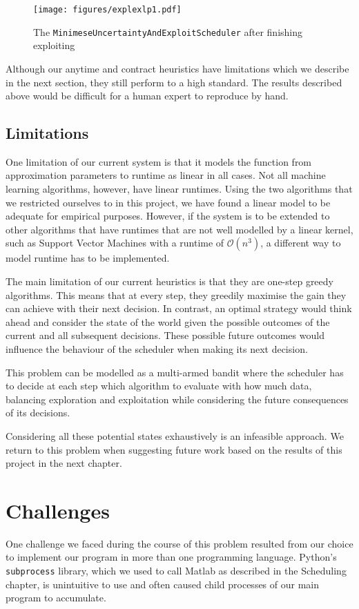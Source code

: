 \documentclass[a4paper,12pt,twoside,openright]{report}
\begin{document}
\begin{figure}
\centering
  \texttt{[image: figures/explexlp1.pdf]}
  \caption{The \texttt{MinimeseUncertaintyAndExploitScheduler} after finishing exploiting}
  \label{explexlp1}
\end{figure}



Although our anytime and contract heuristics have limitations which we describe in the next section, they still perform to a high standard. The results described above would be difficult for a human expert to reproduce by hand.

\subsection{Limitations}
One limitation of our current system is that it models the function from approximation parameters to runtime as linear in all cases. Not all machine learning algorithms, however, have linear runtimes. Using the two algorithms that we restricted ourselves to in this project, we have found a linear model to be adequate for empirical purposes. However, if the system is to be extended to other algorithms that have runtimes that are not well modelled by a linear kernel, such as Support Vector Machines with a runtime of $\mathcal{O}(n^3)$, a different way to model runtime has to be implemented.

The main limitation of our current heuristics is that they are one-step greedy algorithms. This means that at every step, they greedily maximise the gain they can achieve with their next decision. In contrast, an optimal strategy would think ahead and consider the state of the world given the possible outcomes of the current and all subsequent decisions. These possible future outcomes would  influence the behaviour of the scheduler when making its next decision.

This problem can be modelled as a multi-armed bandit where the scheduler has to decide at each step which algorithm to evaluate with how much data, balancing exploration and exploitation while considering the future consequences of its decisions.

Considering all these potential states exhaustively is an infeasible approach. We return to this problem when suggesting future work based on the results of this project in the next chapter.

\section{Challenges}
One challenge we faced during the course of this problem resulted from our choice to implement our program in more than one programming language. Python's \texttt{subprocess} library, which we used to call Matlab as described in the Scheduling chapter, is unintuitive to use and often caused child processes of our main program to accumulate. 
\end{document}
